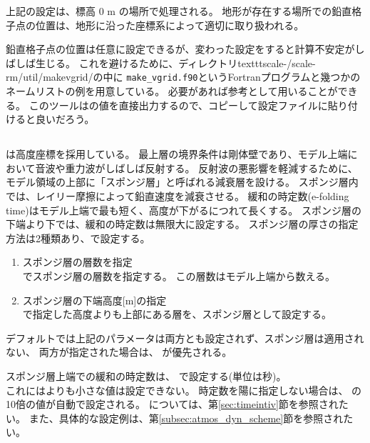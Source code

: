 上記の設定は、標高 0 m の場所で処理される。
地形が存在する場所での鉛直格子点の位置は、地形に沿った座標系によって適切に取り扱われる。


鉛直格子点の位置は任意に設定できるが、変わった設定をすると計算不安定がしばしば生じる。
これを避けるために、ディレクトリtexttt{scale-\version/scale-rm/util/makevgrid/}の中に
\verb|make_vgrid.f90|というFortranプログラムと幾つかのネームリストの例を用意している。
必要があれば参考として用いることができる。
このツールはの値を直接出力するので、コピーして設定ファイルに貼り付けると良いだろう。

\subsection{\SubsecRayleighDampingSetting} \label{subsec:raydamp}

\scalerm は高度座標を採用している。
最上層の境界条件は剛体壁であり、モデル上端において音波や重力波がしばしば反射する。
反射波の悪影響を軽減するために、モデル領域の上部に「スポンジ層」と呼ばれる減衰層を設ける。
スポンジ層内では、レイリー摩擦によって鉛直速度を減衰させる。
緩和の時定数(e-folding time)はモデル上端で最も短く、高度が下がるにつれて長くする。
スポンジ層の下端より下では、緩和の時定数は無限大に設定する。
スポンジ層の厚さの指定方法は2種類あり、で設定する。
\begin{enumerate}
\item スポンジ層の層数を指定\\
   でスポンジ層の層数を指定する。
  この層数はモデル上端から数える。
\item スポンジ層の下端高度[m]の指定\\
   で指定した高度よりも上部にある層を、スポンジ層として設定する。
\end{enumerate}

デフォルトでは上記のパラメータは両方とも設定されず、スポンジ層は適用されない、
両方が指定された場合は、 が優先される。

スポンジ層上端での緩和の時定数は、 で設定する(単位は秒)。\\
これにはよりも小さな値は設定できない。
時定数を陽に指定しない場合は、 の10倍の値が自動で設定される。
については、第\ref{sec:timeintiv}節を参照されたい。
また、具体的な設定例は、第\ref{subsec:atmos_dyn_scheme}節を参照されたい。

